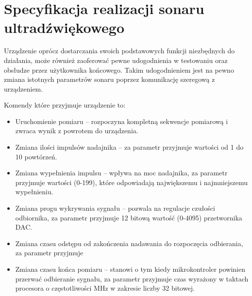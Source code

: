 \chapter[Specyfikacja realizacji sonaru ultradźwiękowego]{Specyfikacja realizacji sonaru ultradźwiękowego}

\label{chapter:specyfikacja}

Urządzenie oprócz dostarczania swoich podstawowych funkcji niezbędnych do działania, 
może również zaoferować pewne udogodnienia w testowaniu oraz obsłudze przez użytkownika końcowego.
Takim udogodnieniem jest na pewno zmiana istotnych parametrów sonaru poprzez komunikację szeregową z urządzeniem.
\vspace{2cm}

Komendy które przyjmuje urządzenie to:
\begin{itemize}
    \item Uruchomienie pomiaru -- rozpoczyna kompletną sekwencje pomiarową i zwraca wynik z powrotem do urządzenia.
    \item Zmiana ilości impulsów nadajnika -- za parametr przyjmuje wartości od 1 do 10 powtórzeń.
    \item Zmiana wypełnienia impulsu -- wpływa na moc nadajnika, za parametr przyjmuje wartości (0-199), które odpowiadają największemu i najmniejszemu wypełnieniu.
    \item Zmiana progu wykrywania sygnału  -- pozwala na regulacje czułości odbiornika, za parametr przyjmuje 12 bitową wartość (0-4095) przetwornika DAC.
    \item Zmiana czasu odstępu od zakończenia nadawania do rozpoczęcia odbierania, za parametr przyjmuje 
    \item Zmiana czasu końca pomiaru -- stanowi o tym kiedy mikrokontroler powinien przerwać odbieranie sygnału, za parametr przyjmuje czas wyrażony w taktach procesora o częstotliwości \unit[80]{MHz} w zakresie liczby 32 bitowej. 
\end{itemize}



